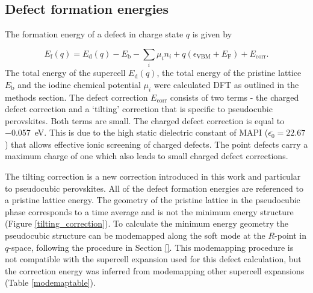 \subsection{Defect formation energies} \label{ss:dfe}

The formation energy of a defect in charge state $q$ is given by

\begin{equation} \label{eqn_formation_energy}
E_\mathrm{f}(q) = E_\mathrm{d}(q) - E_\mathrm{b} - \sum_i \mu_i n_i + q(\epsilon_\mathrm{VBM}+E_\mathrm{F}) + E_\mathrm{corr}.
\end{equation}
The total energy of the supercell $E_\mathrm{d}(q)$, the total energy of the pristine lattice $E_\mathrm{b}$ and the iodine chemical potential $\mu_i$ were calculated DFT as outlined in the methods section.
The defect correction $E_\mathrm{corr}$ consists of two terms - the charged defect correction and a `tilting' correction that is specific to pseudocubic perovskites.
Both terms are small. The charged defect correction is equal to \SI{-0.057}{eV}. This is due to the high static dielectric constant of MAPI ($\bar{\epsilon_0}=22.67$)\autocite{Brivio2013} that allows effective ionic screening of charged defects. The point defects carry a maximum charge of one which also leads to small charged defect corrections.

The tilting correction is a new correction introduced in this work and particular to pseudocubic perovskites. All of the defect formation energies are referenced to a pristine lattice energy. The geometry of the pristine lattice in the pseudocubic phase corresponds to a time average and is not the minimum energy structure (Figure \ref{tilting_correction}). To calculate the minimum energy geometry the pseudocubic structure can be modemapped along the soft mode at the $R$-point in $q$-space, following the procedure in Section \ref{}. This modemapping procedure is not compatible with the supercell expansion used for this defect calculation, but the correction energy was inferred from modemapping other supercell expansions (Table \ref{modemaptable}).

